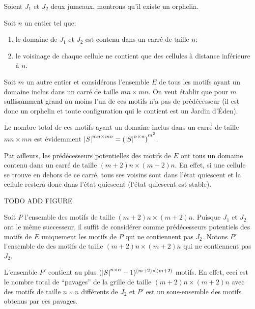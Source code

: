 \begin{proofI}
\begin{itemize}
		      Soient $J_1$ et $J_2$ deux jumeaux, montrons qu'il existe un orphelin.

		      Soit $n$ un entier tel que:
		      \begin{enumerate}
			      \item le domaine de $J_1$ et $J_2$ est contenu dans un carré de taille $n$;
			      \item le voisinage de chaque cellule ne contient que des cellules à distance inférieure à $n$.
		      \end{enumerate}
		      Soit $m$ un autre entier et considérons l'ensemble $E$ de tous les motifs ayant un domaine inclus 
		      dans un carré de taille $mn \times mn$. 
		      On veut établir que pour $m$ suffisamment grand au moins l'un de ces motifs n'a pas 
		      de prédécesseur (il est donc un orphelin et toute 
		      configuration qui le contient est un Jardin d'\'Eden).
		      
		      Le nombre total de ces motifs ayant un domaine inclus 
		      dans un carré de taille $mn \times mn$ est évidemment $\left|S\right|  ^{mn \times mn}= {(\left|S\right|  ^{n \times n})}^{m^2}$.
		      
		      Par ailleurs, les prédécesseurs potentielles des motifs de $E$ ont tous un domaine contenu dans 
		      un carré de taille $(m+2)n \times (m+2)n$. 
		      En effet, si une cellule se trouve en dehors de ce carré, tous ses voisins sont dans l'état quiescent et la cellule 
		      restera donc dans l'état quiescent (l'état quiescent est stable).
		      
		      TODO ADD FIGURE
		      
		      Soit $P$ l'ensemble des motifs de taille $(m+2)n \times (m+2)n$. Puisque  $J_1$ et $J_2$  ont 
		      le même successeur, il suffit de considérer comme prédécesseurs potentiels 
		      des motifs de $E$ uniquement les motifs de $P$ qui ne contiennent pas $J_2$. 
		      Notons $P'$ l'ensemble de  des motifs de taille $(m+2)n \times (m+2)n$ qui ne contiennent pas $J_2$. 
		      
		      L'ensemble $P'$ contient au plus $(\left|S\right| ^{n \times n}-1)^{(m + 2) \times (m + 2)}$ motifs.
		      En effet, ceci est le nombre total de ``pavages'' de la grille de taille $(m+2)n \times (m+2)n$ avec des motifs 
		      de taille $n \times n$ différents de $J_2$ et $P'$ est un sous-ensemble des motifs obtenus par ces pavages.
		      

\end{itemize}
\end{proofI}
